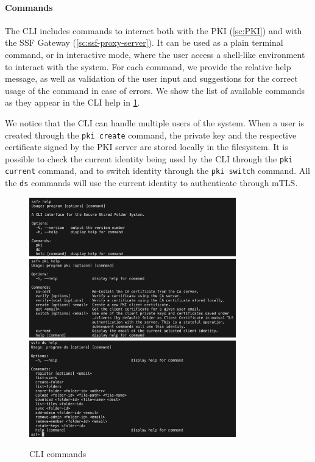 \paragraph{Commands}
The CLI includes commands to interact both with the PKI (\cref{sc:PKI}) 
and with the SSF Gateway (\cref{sc:ssf-proxy-server}).
It can be used as a plain terminal command, or
in interactive mode, where the user access
a shell-like environment to interact with the system.
For each command, we provide the relative help message,
as well as validation of the user input and 
suggestions for the correct usage of the command
in case of errors.
We show the list of available commands as they appear
in the CLI help in \cref{fig:climain}. 

We notice that the CLI can handle multiple users of
the system. When a user is created through the
\texttt{pki create} command, the private key and
the respective certificate signed by the PKI server
are stored locally in the filesystem.
It is possible to check the current identity being
used by the CLI through the \texttt{pki current} command,
and to switch identity through the \texttt{pki switch} command.
All the \texttt{ds} commands
will use the current identity to authenticate 
through mTLS.

\begin{figure}
    \centering
    \includegraphics[width=0.8\textwidth]{figures/climain.png}
    \includegraphics[width=0.8\textwidth]{figures/pkimain.png}
    \includegraphics[width=0.8\textwidth]{figures/dsmain.png}
    \caption{CLI commands}
    \label{fig:climain}
\end{figure}

